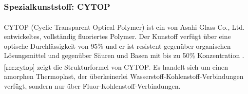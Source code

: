 \subsubsection{Spezialkunststoff: CYTOP\textsuperscript{\texttrademark}}
\label{subsec:pofcytop}

CYTOP\textsuperscript{\texttrademark} (Cyclic Transparent Optical Polymer) ist
ein von Asahi Glass Co., Ltd. entwickeltes, vollständig fluoriertes Polymer. Der
Kunstoff verfügt über eine optische Durchlässigkeit von 95\% und er ist
resistent gegenüber organischen Lösungsmittel und gegenüber Säuren und Basen mit
bis zu 50\% Konzentration \cite{pofagc}. \autoref{rec:cytop} zeigt die
Strukturformel von CYTOP\textsuperscript{\texttrademark}. Es handelt sich um
einen amorphen Thermoplast, der überkeinerlei
Wasserstoff-Kohlenstoff-Verbindungen verfügt, sondern nur über
Fluor-Kohlenstoff-Verbindungen.


